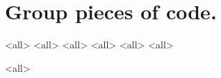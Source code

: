 \section{Group pieces of code.}
\mode<all>{}
\mode<all>{}
\mode<all>{}
\mode<all>{}
\mode<all>{}
\mode<all>{}

\mode<all>{}


